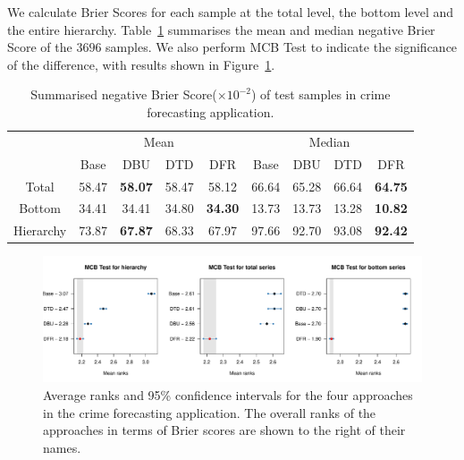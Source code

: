 \documentclass[a4paper,review,12pt,authoryear]{elsarticle}
\begin{document}
     We calculate Brier Scores for each sample at the total level, the bottom level and the entire hierarchy.
     Table~\ref{tab:crime_bs} summarises the mean and median negative Brier Score of the $3696$ samples.
     We also perform MCB Test to indicate the significance of the difference, with results shown in Figure~\ref{fig:application_crime}.

     \begin{table}[h]
       \centering
       \caption{\label{tab:crime_bs}Summarised negative Brier Score($\times 10^{-2}$) of test samples in crime forecasting application.}
       \begin{tabular}{ccccccccc}
       \toprule
       &\multicolumn{4}{c}{Mean}
       & \multicolumn{4}{c}{Median} \\ \cmidrule(lr){2-5} \cmidrule(lr){6-9}
        & Base & DBU & DTD & DFR &  Base & DBU & DTD & DFR \\\midrule
       Total & 58.47 & \textbf{58.07} & 58.47 & 58.12 & 66.64 & 65.28 & 66.64 & \textbf{64.75} \\
       Bottom & 34.41 & 34.41 & 34.80 & \textbf{34.30} & 13.73 & 13.73 & 13.28 & \textbf{10.82}\\
       Hierarchy & 73.87 & \textbf{67.87} & 68.33 & 67.97 & 97.66 & 92.70 & 93.08 & \textbf{92.42}\\
       \bottomrule
       \end{tabular}
       \end{table}

     \begin{figure}[h]
       \caption{\label{fig:application_crime}Average ranks and 95\% confidence intervals for the four approaches in the crime forecasting application. The overall ranks of the approaches in terms of Brier scores are shown to the right of their names.}
       \centering
       \includegraphics[width=\textwidth]{figures/dc_crime_mcb.pdf}
     \end{figure}
\end{document}
